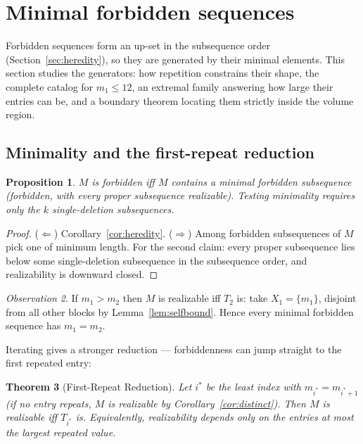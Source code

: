 \documentclass[11pt]{article}
\newtheorem{theorem}{Theorem}[section]
\newtheorem{proposition}[theorem]{Proposition}
\theoremstyle{definition}
\theoremstyle{remark}
\newtheorem{observation}[theorem]{Observation}
\begin{document}
\section{Minimal forbidden sequences}\label{sec:minimal}

Forbidden sequences form an up-set in the subsequence order
(Section~\ref{sec:heredity}), so they are generated by their minimal elements.
This section studies the generators: how repetition constrains their shape, the
complete catalog for $m_1\le12$, an extremal family answering how large their
entries can be, and a boundary theorem locating them strictly inside the volume
region.

\subsection{Minimality and the first-repeat reduction}

\begin{proposition}\label{prop:minimalwitness}
$M$ is forbidden iff $M$ contains a minimal forbidden subsequence (forbidden, with
every proper subsequence realizable). Testing minimality requires only the $k$
single-deletion subsequences.
\end{proposition}

\begin{proof}
($\Leftarrow$) Corollary~\ref{cor:heredity}. ($\Rightarrow$) Among forbidden
subsequences of $M$ pick one of minimum length. For the second claim: every proper
subsequence lies below some single-deletion subsequence in the subsequence order,
and realizability is downward closed.
\end{proof}

\begin{observation}\label{obs:doubledmax}
If $m_1>m_2$ then $M$ is realizable iff $T_2$ is: take $X_1=\{m_1\}$, disjoint from
all other blocks by Lemma~\ref{lem:selfbound}. Hence every minimal forbidden
sequence has $m_1=m_2$.
\end{observation}

Iterating gives a stronger reduction --- forbiddenness can jump straight to the first
repeated entry:

\begin{theorem}[First-Repeat Reduction]\label{thm:firstrepeat}
Let $i^*$ be the least index with $m_{i^*}=m_{i^*+1}$ (if no entry repeats, $M$ is
realizable by Corollary~\ref{cor:distinct}). Then $M$ is realizable iff $T_{i^*}$ is.
Equivalently, realizability depends only on the entries at most the largest repeated
value.
\end{theorem}
\end{document}
